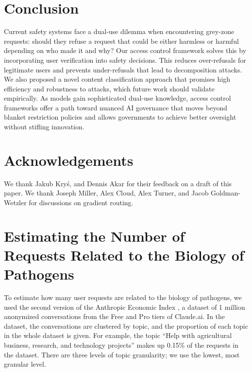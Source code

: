 \documentclass{article}
\theoremstyle{plain}
\theoremstyle{definition}
\theoremstyle{remark}
\begin{document}
\section{Conclusion}

Current safety systems face a dual-use dilemma when encountering grey-zone requests: should they refuse a request that could be either harmless or harmful depending on who made it and why?
Our access control framework solves this by incorporating user verification into safety decisions.
This reduces over-refusals for legitimate users and prevents under-refusals that lead to decomposition attacks.
We also proposed a novel content classification approach that promises high efficiency and robustness to attacks, which future work should validate empirically.
As models gain sophisticated dual-use knowledge, access control frameworks offer a path toward nuanced AI governance that moves beyond blanket restriction policies and allows governments to achieve better oversight without stifling innovation.

\section*{Acknowledgements}

We thank Jakub Kryś, and Dennis Akar for their feedback on a draft of this paper. We thank Joseph Miller, Alex Cloud, Alex Turner, and Jacob Goldman-Wetzler for discussions on gradient routing.




\newpage
\appendix

\section{Estimating the Number of Requests Related to the Biology of Pathogens} \label{appendix:estimating-biology-requests}

To estimate how many user requests are related to the biology of pathogens, we used the second version of the Anthropic Economic Index \cite{handa2025economictasksperformedai}, a dataset of 1 million anonymized conversations from the Free and Pro tiers of Claude.ai.
In the dataset, the conversations are clustered by topic, and the proportion of each topic in the whole dataset is given.
For example, the topic ``Help with agricultural business, research, and technology projects'' makes up 0.15\% of the requests in the dataset.
There are three levels of topic granularity; we use the lowest, most granular level.
\end{document}
